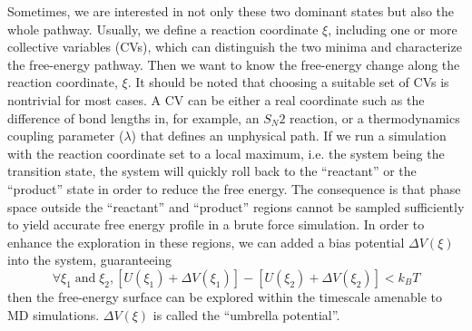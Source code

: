 Sometimes, we are interested in not only these two dominant states but also the whole pathway. Usually, we define a reaction coordinate $\xi$, including one or more collective variables (CVs), which can distinguish the two minima and characterize the free-energy pathway. Then we want to know the free-energy change along the reaction coordinate, $\xi$. It should be noted that choosing a suitable set of CVs is nontrivial for most cases.\cite{LeitoldJCP2020} A CV can be either a real coordinate such as the difference of bond lengths in, for example, an $S_N2$ reaction, or a thermodynamics coupling parameter ($\lambda$) that defines an unphysical path. If we run a simulation with the reaction coordinate set to a local maximum, i.e. the system being the transition state, the system will quickly roll back to the ``reactant'' or the ``product'' state in order to reduce the free energy. The consequence is that phase space outside the ``reactant'' and ``product'' regions cannot be sampled sufficiently to yield accurate free energy profile in a brute force simulation. In order to enhance the exploration in these regions, we can added a bias potential $\Delta V(\xi)$ into the system, guaranteeing
\begin{equation}
	\forall \xi_{1} \; \mathrm{and} \; \xi_{2}, \left [ U(\xi_{1}) + \Delta V(\xi_{1}) \right ]  - \left [ U(\xi_{2}) + \Delta V(\xi_{2}) \right ] < k_BT
\end{equation}
then the free-energy surface can be explored within the timescale amenable to MD simulations. $\Delta V(\xi)$ is called the ``umbrella potential''.

